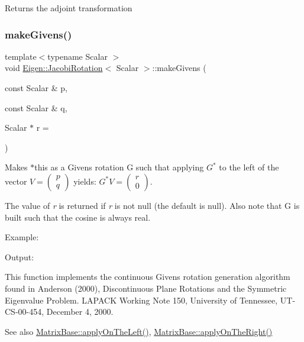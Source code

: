 Returns the adjoint transformation \mbox{\label{class_eigen_1_1_jacobi_rotation_adb5bcb0d28a95e39ca31c2c17e866092}} 
\subsubsection{\texorpdfstring{makeGivens()}{makeGivens()}}
{\footnotesize\ttfamily template$<$typename Scalar $>$ \\
void \mbox{\hyperlink{class_eigen_1_1_jacobi_rotation}{Eigen\+::\+Jacobi\+Rotation}}$<$ Scalar $>$\+::make\+Givens (\begin{DoxyParamCaption}\item[{const Scalar \&}]{p,  }\item[{const Scalar \&}]{q,  }\item[{Scalar $\ast$}]{r = {} }\end{DoxyParamCaption})}

Makes {\ttfamily $\ast$this} as a Givens rotation {\ttfamily G} such that applying $ G^* $ to the left of the vector $ V = \left ( \begin{array}{c} p \\ q \end{array} \right )$ yields\+: $ G^* V = \left ( \begin{array}{c} r \\ 0 \end{array} \right )$.

The value of {\itshape r} is returned if {\itshape r} is not null (the default is null). Also note that G is built such that the cosine is always real.

Example\+: 
\begin{DoxyCodeInclude}{0}
\end{DoxyCodeInclude}
 Output\+: 
\begin{DoxyVerbInclude}
\end{DoxyVerbInclude}


This function implements the continuous Givens rotation generation algorithm found in Anderson (2000), Discontinuous Plane Rotations and the Symmetric Eigenvalue Problem. L\+A\+P\+A\+CK Working Note 150, University of Tennessee, U\+T-\/\+C\+S-\/00-\/454, December 4, 2000.

\begin{DoxySeeAlso}{See also}
\mbox{\hyperlink{class_eigen_1_1_matrix_base_a3a08ad41e81d8ad4a37b5d5c7490e765}{Matrix\+Base\+::apply\+On\+The\+Left()}}, \mbox{\hyperlink{class_eigen_1_1_matrix_base_a45d91752925d2757fc8058a293b15462}{Matrix\+Base\+::apply\+On\+The\+Right()}} 
\end{DoxySeeAlso}
\mbox{\label{class_eigen_1_1_jacobi_rotation_a69076401f22e883dc76b6ff9074ac669}} 
